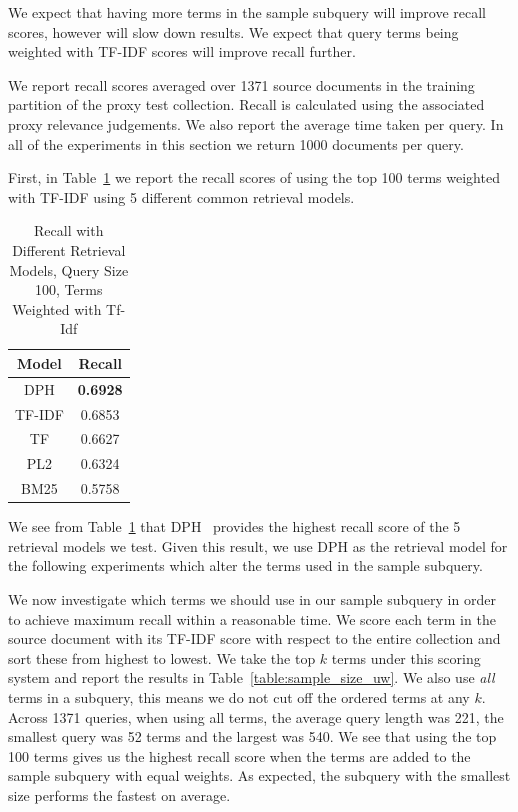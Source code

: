\documentclass{mpaper}
\let\oldcite=\cite
\renewcommand\cite[1]{\ifthenelse{\equal{#1}{NEEDED}}{\ensuremath{^\texttt{[citation~needed]}}}{\oldcite{#1}}}
\begin{document}
We expect that having more terms in the sample subquery will improve recall scores, however will slow down results. We expect that query terms being weighted with TF-IDF scores will improve recall further.


We report recall scores averaged over 1371 source documents in the training partition of the proxy test collection. Recall is calculated using the associated proxy relevance judgements.
We also report the average time taken per query.
In all of the experiments in this section we return 1000 documents per query.

First, in Table~\ref{table:recallmodel} we report the recall scores of using the top 100 terms weighted with TF-IDF using 5 different common retrieval models.
\begin{table}[H]
\centering
\begin{tabular}{|c|c|}
\hline
Model	 		& Recall 				\\ \hline
DPH 			& \textbf{0.6928} 		\\
TF-IDF 			& 0.6853 				\\
TF 				& 0.6627 				\\
PL2 			& 0.6324 				\\
BM25 			& 0.5758 				\\ \hline
\end{tabular}
\caption{Recall with Different Retrieval Models, Query Size 100, Terms Weighted with Tf-Idf}
\label{table:recallmodel}
\end{table}

We see from Table~\ref{table:recallmodel} that DPH~\cite{NEEDED} provides the highest recall score of the 5 retrieval models we test. Given this result, we use DPH as the retrieval model for the following experiments which alter the terms used in the sample subquery.

We now investigate which terms we should use in our sample subquery in order to achieve maximum recall within a reasonable time. We score each term in the source document with its TF-IDF score with respect to the entire collection and sort these from highest to lowest. We take the top $k$ terms under this scoring system and report the results in Table~\ref{table:sample_size_uw}.
We also use \textit{all} terms in a subquery, this means we do not cut off the ordered terms at any $k$. Across 1371 queries, when using all terms,  the average query length was 221, the smallest query was 52 terms and the largest was 540.
We see that using the top 100 terms gives us the highest recall score when the terms are added to the sample subquery with equal weights. As expected, the subquery with the smallest size performs the fastest on average.
\end{document}

